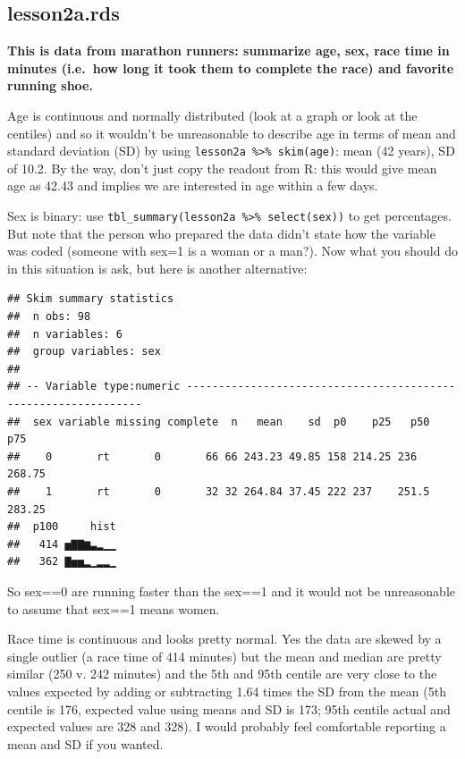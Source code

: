 \documentclass[]{book}
\newenvironment{Shaded}{\begin{snugshade}}{\end{snugshade}}
\newcommand{\KeywordTok}[1]{\textcolor[rgb]{0.13,0.29,0.53}{\textbf{#1}}}
\newcommand{\NormalTok}[1]{#1}
\newcommand{\OperatorTok}[1]{\textcolor[rgb]{0.81,0.36,0.00}{\textbf{#1}}}
\newcommand{\StringTok}[1]{\textcolor[rgb]{0.31,0.60,0.02}{#1}}
\begin{document}
\hypertarget{lesson2a.rds}{%
\subsection{lesson2a.rds}\label{lesson2a.rds}}

\textbf{This is data from marathon runners: summarize age, sex, race
time in minutes (i.e.~how long it took them to complete the race) and
favorite running shoe.}

Age is continuous and normally distributed (look at a graph or look at
the centiles) and so it wouldn't be unreasonable to describe age in
terms of mean and standard deviation (SD) by using
\texttt{lesson2a\ \%\textgreater{}\%\ skim(age)}: mean (42 years), SD of
10.2. By the way, don't just copy the readout from R: this would give
mean age as 42.43 and implies we are interested in age within a few
days.

Sex is binary: use
\texttt{tbl\_summary(lesson2a\ \%\textgreater{}\%\ select(sex))} to get
percentages. But note that the person who prepared the data didn't state
how the variable was coded (someone with sex=1 is a woman or a man?).
Now what you should do in this situation is ask, but here is another
alternative:

\begin{Shaded}
\end{Shaded}

\begin{verbatim}
## Skim summary statistics
##  n obs: 98 
##  n variables: 6 
##  group variables: sex 
## 
## -- Variable type:numeric ---------------------------------------------------------------
##  sex variable missing complete  n   mean    sd  p0    p25   p50    p75
##    0       rt       0       66 66 243.23 49.85 158 214.25 236   268.75
##    1       rt       0       32 32 264.84 37.45 222 237    251.5 283.25
##  p100     hist
##   414 ▅▇▇▆▃▂▁▁
##   362 ▇▅▅▂▁▂▂▁
\end{verbatim}

So sex==0 are running faster than the sex==1 and it would not be
unreasonable to assume that sex==1 means women.

Race time is continuous and looks pretty normal. Yes the data are skewed
by a single outlier (a race time of 414 minutes) but the mean and median
are pretty similar (250 v. 242 minutes) and the 5th and 95th centile are
very close to the values expected by adding or subtracting 1.64 times
the SD from the mean (5th centile is 176, expected value using means and
SD is 173; 95th centile actual and expected values are 328 and 328). I
would probably feel comfortable reporting a mean and SD if you wanted.
\end{document}
